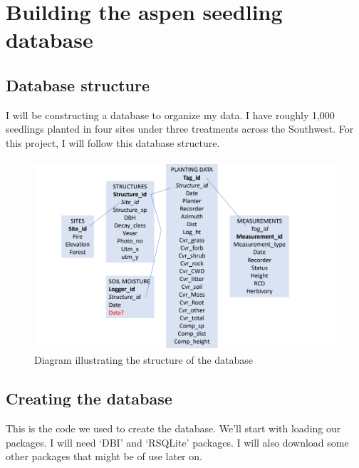 \documentclass[
]{book}
\begin{document}
\hypertarget{building-the-aspen-seedling-database}{%
\chapter{Building the aspen seedling database}\label{building-the-aspen-seedling-database}}

\hypertarget{database-structure}{%
\section{Database structure}\label{database-structure}}

I will be constructing a database to organize my data. I have roughly 1,000 seedlings planted in four sites under three treatments across the Southwest. For this project, I will follow this database structure.

\begin{figure}

{\centering \includegraphics[width=1\linewidth]{database_structure} 

}

\caption{Diagram illustrating the structure of the database}\label{fig:diagram}
\end{figure}

\hypertarget{creating-the-database}{%
\section{Creating the database}\label{creating-the-database}}

This is the code we used to create the database. We'll start with loading our packages. I will need `DBI' and `RSQLite' packages. I will also download some other packages that might be of use later on.
\end{document}
